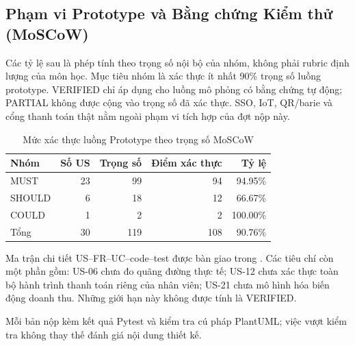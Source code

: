 \subsection{Phạm vi Prototype và Bằng chứng Kiểm thử (MoSCoW)}
Các tỷ lệ sau là phép tính theo trọng số nội bộ của nhóm, không phải rubric định lượng của môn học. Mục tiêu nhóm là xác thực ít nhất 90\% trọng số luồng prototype. VERIFIED chỉ áp dụng cho luồng mô phỏng có bằng chứng tự động; PARTIAL không được cộng vào trọng số đã xác thực. SSO, IoT, QR/barie và cổng thanh toán thật nằm ngoài phạm vi tích hợp của đợt nộp này.
\begin{table}[H]\centering\small
\caption{Mức xác thực luồng Prototype theo trọng số MoSCoW}\label{tab:moscow-scope}
\begin{tabularx}{\textwidth}{|X|r|r|r|r|}\hline
Nhóm & Số US & Trọng số & Điểm xác thực & Tỷ lệ \\\hline
MUST & 23 & 99 & 94 & 94.95\% \\\hline
SHOULD & 6 & 18 & 12 & 66.67\% \\\hline
COULD & 1 & 2 & 2 & 100.00\% \\\hline
Tổng & 30 & 119 & 108 & 90.76\% \\\hline
\end{tabularx}\end{table}
\noindent Ma trận chi tiết US--FR--UC--code--test được bàn giao trong . Các tiêu chí còn một phần gồm: US-06 chưa đo quãng đường thực tế; US-12 chưa xác thực toàn bộ hành trình thanh toán riêng của nhân viên; US-21 chưa mô hình hóa biến động doanh thu. Những giới hạn này không được tính là VERIFIED.
\par Mỗi bản nộp kèm kết quả Pytest và kiểm tra cú pháp PlantUML; việc vượt kiểm tra không thay thế đánh giá nội dung thiết kế.
